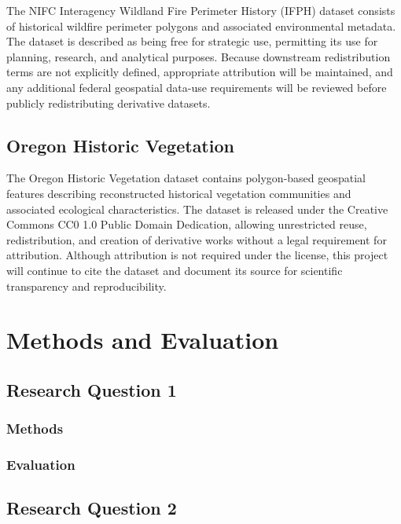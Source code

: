 \documentclass[
  letterpaper,
  DIV=11,
  numbers=noendperiod]{scrartcl}
\begin{document}
The NIFC Interagency Wildland Fire Perimeter History (IFPH) dataset
consists of historical wildfire perimeter polygons and associated
environmental metadata. The dataset is described as being free for
strategic use, permitting its use for planning, research, and analytical
purposes. Because downstream redistribution terms are not explicitly
defined, appropriate attribution will be maintained, and any additional
federal geospatial data-use requirements will be reviewed before
publicly redistributing derivative datasets.

\subsection{Oregon Historic
Vegetation}\label{oregon-historic-vegetation}

The Oregon Historic Vegetation dataset contains polygon-based geospatial
features describing reconstructed historical vegetation communities and
associated ecological characteristics. The dataset is released under the
Creative Commons CC0 1.0 Public Domain Dedication, allowing unrestricted
reuse, redistribution, and creation of derivative works without a legal
requirement for attribution. Although attribution is not required under
the license, this project will continue to cite the dataset and document
its source for scientific transparency and reproducibility.

\section{Methods and Evaluation}\label{methods-and-evaluation}

\subsection{Research Question 1}\label{research-question-1}

\subsubsection{Methods}\label{methods}

\subsubsection{Evaluation}\label{evaluation}

\subsection{Research Question 2}\label{research-question-2}
\end{document}
